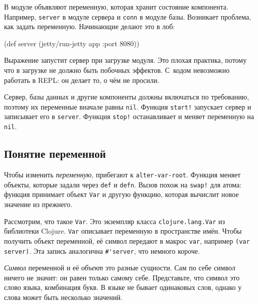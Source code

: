 В модуле объявляют переменную, которая хранит состояние компонента. Например,
\verb|server| в модуле сервера и \verb|conn| в модуле базы. Возникает
проблема, как задать переменную. Начинающие делают это в лоб:

\begin{english}
  \begin{clojure}
(def server (jetty/run-jetty app {:port 8080}))
  \end{clojure}
\end{english}

Выражение запустит сервер при загрузке модуля. Это плохая практика, потому что в
загрузке не должно быть побочных эффектов. С~кодом невозможно работать в REPL:
он делает то, о чём не просили.

Сервер, базы данных и другие компоненты должны включаться по требованию, поэтому
их переменные вначале равны \verb|nil|. Функция \verb|start!| запускает
сервер и записывает его в \verb|server|. Функция \verb|stop!| останавливает
и меняет переменную на \verb|nil|.

\subsection{Понятие переменной}


\label{var-section}

Чтобы изменить \emph{переменную}, прибегают к \verb|alter-var-root|. Функция
меняет объекты, которые задали через \verb|def| и \verb|defn|. Вызов похож
на \verb|swap!| для атома: функция принимает объект \verb|Var| и другую
функцию, которая вычислит новое значение из прежнего.


Рассмотрим, что такое \verb|Var|. Это экземпляр класса \verb|clojure.lang.Var|
из библиотеки Clojure. \verb|Var| описывает переменную в пространстве имён.
Чтобы получить объект переменной, её символ передают в макрос \verb|var|,
например \verb|(var server)|. Эта запись аналогична \verb|#'server|,
что немного короче.



\emph{Символ} переменной и её \emph{объект} это разные сущности. Сам по себе
символ ничего не значит: он равен только самому себе. Представьте, что символ
это слово языка, комбинация букв. В языке не бывает одинаковых слов, однако у
слова может быть несколько значений.

